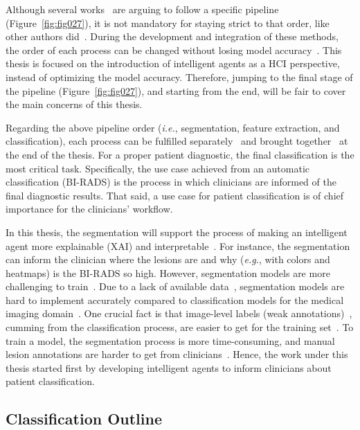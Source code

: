 Although several works~\cite{9247957} are arguing to follow a specific pipeline (Figure~\ref{fig:fig027}), it is not mandatory for staying strict to that order, like other authors did~\cite{8451510, AGRAWAL201927}.
During the development and integration of these methods, the order of each process can be changed without losing model accuracy~\cite{8462671}.
This thesis is focused on the introduction of intelligent agents as a \ac{HCI} perspective, instead of optimizing the model accuracy.
Therefore, jumping to the final stage of the pipeline (Figure~\ref{fig:fig027}), and starting from the end, will be fair to cover the main concerns of this thesis.

Regarding the above pipeline order ({\it i.e.}, segmentation, feature extraction, and classification), each process can be fulfilled separately~\cite{8451510, AGRAWAL201927} and brought together~\cite{10.1007/978-3-030-00934-2_99} at the end of the thesis.
For a proper patient diagnostic, the final classification is the most critical task.
Specifically, the use case achieved from an automatic classification (\ac{BI-RADS}) is the process in which clinicians are informed of the final diagnostic results.
That said, a use case for patient classification is of chief importance for the clinicians' workflow.

In this thesis, the segmentation will support the process of making an intelligent agent more explainable (\ac{XAI}) and interpretable~\cite{8622433}.
For instance, the segmentation can inform the clinician where the lesions are and why ({\it e.g.}, with colors and heatmaps) is the \ac{BI-RADS} so high.
However, segmentation models are more challenging to train~\cite{TAJBAKHSH2020101693}.
Due to a lack of available data~\cite{ahmed2020images}, segmentation models are hard to implement accurately compared to classification models for the medical imaging domain~\cite{murtaza2019deep}.
One crucial fact is that image-level labels (weak annotations)~\cite{10.1145/3373017.3373051}, cumming from the classification process, are easier to get for the training set~\cite{TAJBAKHSH2020101693}.
To train a model, the segmentation process is more time-consuming, and manual lesion annotations are harder to get from clinicians~\cite{10.1007/978-3-030-59719-1_44}.
Hence, the work under this thesis started first by developing intelligent agents to inform clinicians about patient classification.

\subsection{Classification Outline}
\label{sec:app004001001}

